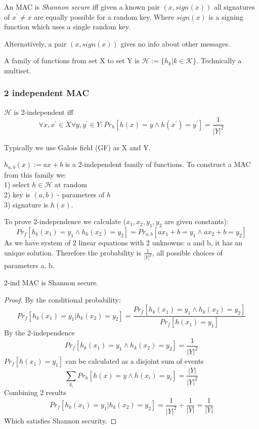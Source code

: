 \begin{definition}
	An MAC is \emph{Shannon secure} iff given a known pair $(x, sign(x))$ all signatures of $x^{\prime} \neq x$ are equally possible for a random key.
	Where $sign(x)$ is a signing function which uses a single random key.

	Alternatively, a pair $(x, sign(x))$ gives no info about other messages.
\end{definition}

\begin{definition}
	A family of functions from set X to set Y is $\mathcal{H} := \{ h_k | k \in \mathcal{K} \}$.
	Technically a multiset.
\end{definition}

\subsubsection{2 independent MAC}

\begin{definition}
	$\mathcal{H}$ is 2-independent iff
	\[ \forall x, x^{\prime} \in X \forall y, y^{\prime} \in Y: Pr_h[h(x) = y \land h(x^{\prime}) = y^{\prime}] = \frac{1}{|Y|^2} \]
\end{definition}

Typically we use Galois field (GF) as X and Y.

\begin{example}
	$h_{a,b}(x) := ax + b$ is a 2-independent family of functions. To construct a MAC from this family we:\\
	1) select $h \in \mathcal{H}$ at random \\
	2) key is $(a,b)$ - parameters of $h$\\
	3) signature is $h(x)$.

	To prove 2-independence we calculate ($x_1, x_2, y_1, y_2$ are given constants):
	\[ Pr_f[ h_k(x_1) = y_1 \land h_k(x_2) = y_2] = Pr_{a,b}[ax_1 + b = y_1 \land ax_2 + b = y_2] \]
	As we have system of 2 linear equations with 2 unknowns: a and b, it has an unique solution.
	Therefore the probability is $\frac{1}{|Y|^2}$, all possible choices of parameters a, b.
\end{example}

\begin{theorem}
	2-ind MAC is Shannon secure.
\end{theorem}
\begin{proof}
	By the conditional probability:
	\[ Pr_f[ h_k(x_1) = y_1 | h_k(x_2) = y_2] = \frac{Pr_f[ h_k(x_1) = y_1 \land h_k(x_2) = y_2]}{Pr_f[h(x_1) = y_1]} \]
	By the 2-independence
	\[ Pr_f[ h_k(x_1) = y_1 \land h_k(x_2) = y_2] = \frac{1}{|Y|^2} \]
	$Pr_f[h(x_1) = y_1]$ can be calculated as a disjoint sum of events
	\[ \sum_{y_i} Pr_h[h(x) = y \land h(x_i) = y_i] = \frac{|Y|}{|Y|^2} \]
	Combining 2 results
	\[ Pr_f[ h_k(x_1) = y_1 | h_k(x_2) = y_2] = \frac{1}{|Y|^2} \div \frac{1}{|Y|} = \frac{1}{|Y|} \]
	Which satisfies Shannon security.
\end{proof}

